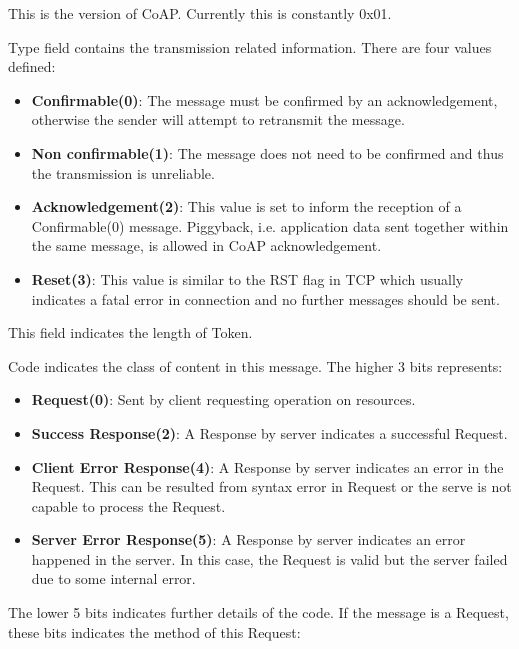 \begin{description}[style=nextline]
	\item[\textbf{Version}]
	This is the version of CoAP. Currently this is constantly 0x01.
	\item[\textbf{Type}]
	Type field contains the transmission related information. There are four values defined:
	\begin{itemize}
		\item \textbf{Confirmable(0)}: The message must be confirmed by an acknowledgement, otherwise the sender will attempt to retransmit the message.
		\item \textbf{Non confirmable(1)}: The message does not need to be confirmed and thus the transmission is unreliable.
		\item \textbf{Acknowledgement(2)}: This value is set to inform the reception of a Confirmable(0) message. Piggyback, i.e. application data sent together within the same message, is allowed in CoAP acknowledgement.
		\item \textbf{Reset(3)}: This value is similar to the RST flag in TCP which usually indicates a fatal error in connection and no further messages should be sent.
	\end{itemize}
	\item[\textbf{Token Length}]
	This field indicates the length of Token.
	\item[\textbf{Code}]
	Code indicates the class of content in this message. The higher 3 bits represents:
	\begin{itemize}
		\item \textbf{Request(0)}: Sent by client requesting operation on resources.
		\item \textbf{Success Response(2)}: A Response by server indicates a successful Request.
		\item \textbf{Client Error Response(4)}: A Response by server indicates an error in the Request. This can be resulted from syntax error in Request or the serve is not capable to process the Request.
		\item \textbf{Server Error Response(5)}: A Response by server indicates an error happened in the server. In this case, the Request is valid but the server failed due to some internal error.
	\end{itemize}
	The lower 5 bits indicates further details of the code.
	If the message is a Request, these bits indicates the method of this Request:
	\begin{description}[style=nextline]
		\item[\textbf{GET}] 

\end{description}
\end{description}
